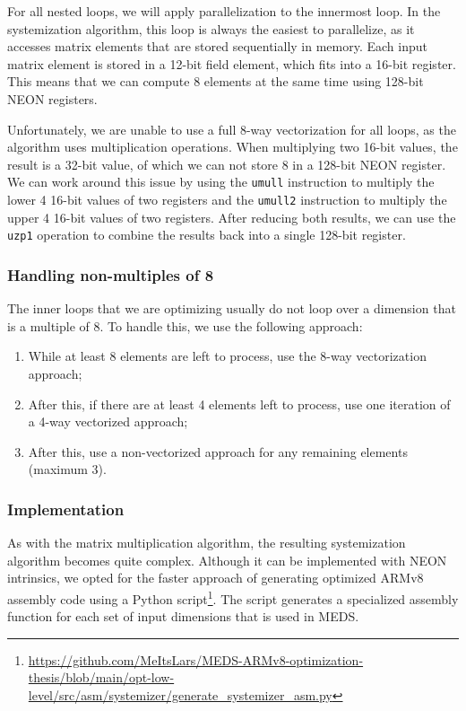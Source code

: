 \documentclass[11pt,a4paper]{report}
\theoremstyle{definition}
\begin{document}
For all nested loops, we will apply parallelization to the innermost loop. In the systemization algorithm, this loop is always the easiest to parallelize, as it accesses matrix elements that are stored sequentially in memory. Each input matrix element is stored in a 12-bit field element, which fits into a 16-bit register. This means that we can compute 8 elements at the same time using 128-bit NEON registers.

Unfortunately, we are unable to use a full 8-way vectorization for all loops, as the algorithm uses multiplication operations. When multiplying two 16-bit values, the result is a 32-bit value, of which we can not store 8 in a 128-bit NEON register. We can work around this issue by using the \texttt{umull} instruction to multiply the lower 4 16-bit values of two registers and the \texttt{umull2} instruction to multiply the upper 4 16-bit values of two registers. After reducing both results, we can use the \texttt{uzp1} operation to combine the results back into a single 128-bit register.

\subsubsection{Handling non-multiples of 8}
\label{sec:matrixsystemizationnonmultiples}
The inner loops that we are optimizing usually do not loop over a dimension that is a multiple of 8. To handle this, we use the following approach:
\begin{enumerate}
  \item While at least 8 elements are left to process, use the 8-way vectorization approach;
  \item After this, if there are at least 4 elements left to process, use one iteration of a 4-way vectorized approach;
  \item After this, use a non-vectorized approach for any remaining elements (maximum 3).
\end{enumerate}

\subsubsection{Implementation}
As with the matrix multiplication algorithm, the resulting systemization algorithm becomes quite complex. Although it can be implemented with NEON intrinsics, we opted for the faster approach of generating optimized ARMv8 assembly code using a Python script\footnote{\url{https://github.com/MeItsLars/MEDS-ARMv8-optimization-thesis/blob/main/opt-low-level/src/asm/systemizer/generate\_systemizer\_asm.py}}. The script generates a specialized assembly function for each set of input dimensions that is used in MEDS.
\end{document}
